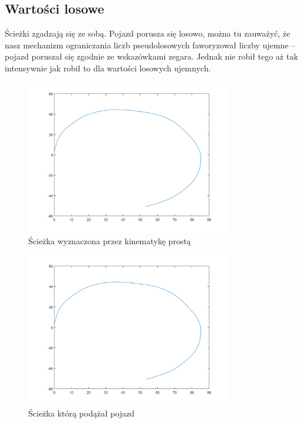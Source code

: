 \documentclass[a4paper, 12pt]{report}
\begin{document}
			\subsection{Wartości losowe}
				Ścieżki zgadzają się ze sobą. Pojazd porusza się losowo, można tu zauważyć, że nasz mechanizm ograniczania liczb pseudolosowych faworyzował liczby ujemne -- pojazd poruszał się zgodnie ze wskazówkami zegara. Jednak nie robił tego aż tak intensywnie jak robił to dla wartości losowych ujemnych.
				\begin{figure}[H]
					\centering
					\includegraphics[width = 0.8\textwidth]{./AP/img/random_both_in_1.png}
					\caption{Ścieżka wyznaczona przez kinematykę prostą}
				\end{figure}
				\begin{figure}[H]
					\centering
					\includegraphics[width = 0.8\textwidth]{./AP/img/random_both_in_2.png}
					\caption{Ścieżka którą podążał pojazd}
				\end{figure}
\end{document}
